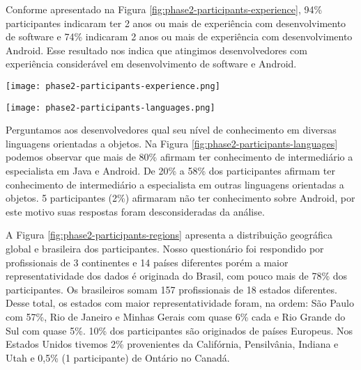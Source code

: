Conforme apresentado na Figura \ref{fig:phase2-participants-experience}, 94\% participantes indicaram ter 2 anos ou mais de experiência com desenvolvimento de software e 74\% indicaram 2 anos ou mais de experiência com desenvolvimento Android. Esse resultado nos indica que atingimos desenvolvedores com experiência considerável em desenvolvimento de software e Android. 

\begin{figure*}[!t]
\centering
\texttt{[image: phase2-participants-experience.png]}
\caption{Tempo de experiência com desenvolvimento de software e desenvolvimento Android dos participantes de S$_2$.}
\label{fig:phase2-participants-experience}
\end{figure*}

\begin{figure*}[!b]
  \centering
  \vspace{-.5cm} 
  \texttt{[image: phase2-participants-languages.png]}
  \caption{Nível de conhecimento em diversas linguagens de programação orientada a objetos dos participantes de S$_2$.}
  \label{fig:phase2-participants-languages}
  \vspace{-.5cm} 
\end{figure*}

Perguntamos aos desenvolvedores qual seu nível de conhecimento em diversas linguagens orientadas a objetos. Na Figura \ref{fig:phase2-participants-languages} podemos observar que mais de 80\% afirmam ter conhecimento de intermediário a especialista em Java e Android. De 20\% a 58\% dos participantes afirmam ter conhecimento de intermediário a especialista em outras linguagens orientadas a objetos. 5 participantes (2\%) afirmaram não ter conhecimento sobre Android, por este motivo suas respostas foram desconsideradas da análise. 

A Figura \ref{fig:phase2-participants-regions} apresenta a distribuição geográfica global e brasileira dos participantes. Nosso questionário foi respondido por profissionais de 3 continentes e 14 países diferentes porém a maior representatividade dos dados é originada do Brasil, com pouco mais de 78\% dos participantes. Os brasileiros somam 157 profissionais de 18 estados diferentes. Desse total, os estados com maior representatividade foram, na ordem: São Paulo com 57\%, Rio de Janeiro e Minhas Gerais com quase 6\% cada e Rio Grande do Sul com quase 5\%. 10\% dos participantes são originados de países Europeus. Nos Estados Unidos tivemos 2\% provenientes da Califórnia, Pensilvânia, Indiana e Utah e 0,5\% (1 participante) de Ontário no Canadá. \\

